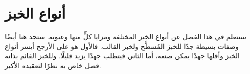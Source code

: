 %
%
%

\chapter{أنواع الخبز}\label{ch:bread-types}

\begin{quoting}
ستتعلم في هذا الفصل عن أنواع الخبز المختلفة ومزايا كلٍّ منها وعيوبه. ستجد هنا أيضًا وصفات بسيطة جدًا للخبز المُسطَّح ولخبز القالب. فالأول هو على الأرجح أيسر أنواع الخبز وأقلها جهدًا يمكن صنعه، أما الثاني فيتطلب جهدًا يزيد قليلًا. وللخبز القائم بذاته فصل خاص به نظرًا لتعقيده الأكبر.
\end{quoting}

